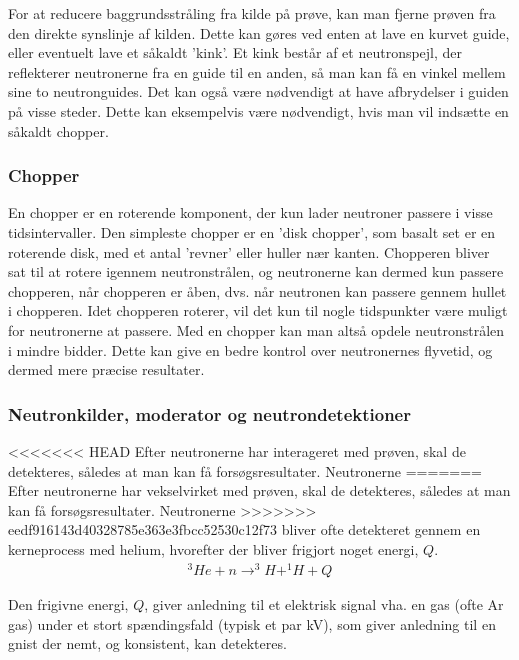 \documentclass[12pt,oneside,a4paper]{article}
\begin{document}
{{{{{For at reducere baggrundsstråling fra kilde på prøve, kan man fjerne prøven fra den direkte synslinje af kilden. Dette kan gøres ved enten at lave en kurvet guide, eller eventuelt lave et såkaldt 'kink'. Et kink består af et neutronspejl, der reflekterer neutronerne fra en guide til en anden, så man kan få en vinkel mellem sine to neutronguides. 
Det kan også være nødvendigt at have afbrydelser i guiden på visse steder. Dette kan eksempelvis være nødvendigt, hvis man vil indsætte en såkaldt chopper.

\subsubsection{Chopper}
En chopper er en roterende komponent, der kun lader neutroner passere i visse tidsintervaller. Den simpleste chopper er en 'disk chopper', som basalt set er en roterende disk, med et antal 'revner' eller huller nær kanten. Chopperen bliver sat til at rotere igennem neutronstrålen, og neutronerne kan dermed kun passere chopperen, når chopperen er åben, dvs. når neutronen kan passere gennem hullet i chopperen. Idet chopperen roterer, vil det kun til nogle tidspunkter være muligt for neutronerne at passere. Med en chopper kan man altså opdele neutronstrålen i mindre bidder. Dette kan give en bedre kontrol over neutronernes flyvetid, og dermed mere præcise resultater. \cite{ess_folder}

\subsubsection{Neutronkilder, moderator og neutrondetektioner}
<<<<<<< HEAD
Efter neutronerne har interageret med prøven, skal de detekteres, således at man kan få forsøgsresultater. Neutronerne 
=======
Efter neutronerne har vekselvirket med prøven, skal de detekteres, således at man kan få forsøgsresultater. Neutronerne 
>>>>>>> eedf916143d40328785e363e3fbcc52530c12f73
bliver ofte detekteret gennem en kerneprocess med helium, hvorefter der bliver frigjort noget energi, $Q$. \cite{lefmann_arleth_kirkensgaard_lebech_thomsen}
\begin{align}
^3He + n \to  ^3H + ^1H + Q
\end{align}

Den frigivne energi, $Q$, giver anledning til et elektrisk signal vha. en gas (ofte Ar gas) under et stort spændingsfald (typisk et par kV), som giver anledning til en gnist der nemt, og konsistent, kan detekteres.

}}}}}
\end{document}

